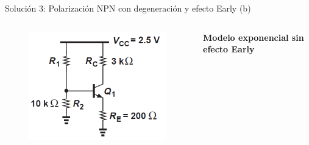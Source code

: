 \documentclass[t,aspectratio=169]{beamer}
\begin{document}
\begin{frame}{Solución 3: Polarización NPN con degeneración y efecto Early (b)}

\begin{columns}
\begin{column}{0.35\textwidth}

\begin{figure}[H]
    \flushleft
    \includegraphics[width=\textwidth]{figuras/efecto_early_ejemplo_3.png}
\end{figure}

\end{column}
\begin{column}{0.65\textwidth}

\textbf{Modelo exponencial sin efecto Early}

\end{column}
\end{columns}
    
\end{frame}
\end{document}
